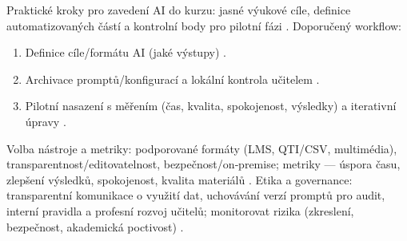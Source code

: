\documentclass{report}%
\begin{document}
%
Praktické kroky pro zavedení AI do kurzu: jasné výukové cíle, definice automatizovaných částí a kontrolní body pro pilotní fázi \cite{node_2-5}.
Doporučený workflow: \begin{enumerate}
\item Definice cíle/formátu AI (jaké výstupy) \cite{node_2-5}.
\item Archivace promptů/konfigurací a lokální kontrola učitelem \cite{node_2-5}.
\item Pilotní nasazení s měřením (čas, kvalita, spokojenost, výsledky) a iterativní úpravy \cite{node_2-5}.
\end{enumerate}
Volba nástroje a metriky: podporované formáty (LMS, QTI/CSV, multimédia), transparentnost/editovatelnost, bezpečnost/on‑premise; metriky — úspora času, zlepšení výsledků, spokojenost, kvalita materiálů \cite{node_2-5}.
Etika a governance: transparentní komunikace o využití dat, uchovávání verzí promptů pro audit, interní pravidla a profesní rozvoj učitelů; monitorovat rizika (zkreslení, bezpečnost, akademická poctivost) \cite{node_2-5}.%

%
%
%
\end{document}
